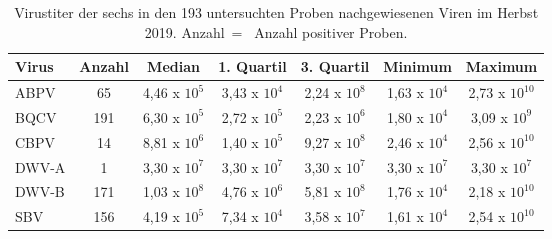 \begin{table}
    \centering
    \caption{Virustiter der sechs in den 193 untersuchten Proben nachgewiesenen Viren im Herbst 2019. Anzahl~= ~Anzahl positiver Proben.}
    \label{tab:f:virusQUANT}
    \begin{tabular}{|l|c|c|c|c|c|c|}
        \hline
        Virus   &   Anzahl & Median             & 1. Quartil        & 3. Quartil        & Minimum           & Maximum\\
        \hline
        ABPV    & 65        & 4,46 x $10^{5}$    & 3,43 x $10^{4}$  & 2,24 x $10^{8}$   & 1,63 x $10^{4}$   & 2,73 x $10^{10}$\\ 
        BQCV    & 191       & 6,30 x $10^{5}$    & 2,72 x $10^{5}$  & 2,23 x $10^{6}$   & 1,80 x $10^{4}$   & 3,09 x $10^{9}$\\
        CBPV    & 14        & 8,81 x $10^{6}$    & 1,40 x $10^{5}$  & 9,27 x $10^{8}$   & 2,46 x $10^{4}$   & 2,56 x $10^{10}$\\
        DWV-A   & 1         & 3,30 x $10^{7}$    & 3,30 x $10^{7}$  & 3,30 x $10^{7}$   & 3,30 x $10^{7}$   & 3,30 x $10^{7}$\\
        DWV-B   & 171       & 1,03 x $10^{8}$    & 4,76 x $10^{6}$  & 5,81 x $10^{8}$   & 1,76 x $10^{4}$   & 2,18 x $10^{10}$\\
        SBV     & 156       & 4,19 x $10^{5}$    & 7,34 x $10^{4}$  & 3,58 x $10^{7}$   & 1,61 x $10^{4}$   & 2,54 x $10^{10}$\\
        \hline
    \end{tabular}
\end{table}